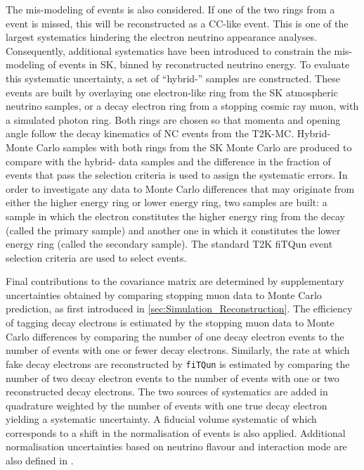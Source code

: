 The mis-modeling of  events is also considered. If one of the two rings from a  event is missed, this will be reconstructed as a CC-like event. This is one of the largest systematics hindering the electron neutrino appearance analyses. Consequently, additional systematics have been introduced to constrain the mis-modeling of  events in SK, binned by reconstructed neutrino energy. To evaluate this systematic uncertainty, a set of ``hybrid-'' samples are constructed. These events are built by overlaying one electron-like ring from the SK atmospheric neutrino samples, or a decay electron ring from a stopping cosmic ray muon, with a simulated photon ring. Both rings are chosen so that momenta and opening angle follow the decay kinematics of NC  events from the T2K-MC. Hybrid- Monte Carlo samples with both rings from the SK Monte Carlo are produced to compare with the hybrid- data samples and the difference in the fraction of events that pass the  selection criteria is used to assign the systematic errors. In order to investigate any data to Monte Carlo differences that may originate from either the higher energy ring or lower energy ring, two samples are built: a sample in which the electron constitutes the higher energy ring from the  decay (called the primary sample) and another one in which it constitutes the lower energy ring (called the secondary sample). The standard T2K  fiTQun event selection criteria are used to select events.

Final contributions to the covariance matrix are determined by supplementary uncertainties obtained by comparing stopping muon data to Monte Carlo prediction, as first introduced in \autoref{sec:Simulation_Reconstruction}. The efficiency of tagging decay electrons is estimated by the stopping muon data to Monte Carlo differences by comparing the number of one decay electron events to the number of events with one or fewer decay electrons. Similarly, the rate at which fake decay electrons are reconstructed by \texttt{fiTQun} is estimated by comparing the number of two decay electron events to the number of events with one or two reconstructed decay electrons. The two sources of systematics are added in quadrature weighted by the number of events with one true decay electron yielding a  systematic uncertainty.
A fiducial volume systematic of  which corresponds to a  shift in the normalisation of events is also applied. Additional normalisation uncertainties based on neutrino flavour and interaction mode are also defined in \cite{t2k_tn_399, t2k_tn_186, t2k_tn_107}.

